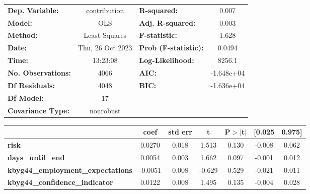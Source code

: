 \begin{center}
\begin{tabular}{lclc}
\toprule
\textbf{Dep. Variable:}                     &   contribution   & \textbf{  R-squared:         } &     0.007   \\
\textbf{Model:}                             &       OLS        & \textbf{  Adj. R-squared:    } &     0.003   \\
\textbf{Method:}                            &  Least Squares   & \textbf{  F-statistic:       } &     1.628   \\
\textbf{Date:}                              & Thu, 26 Oct 2023 & \textbf{  Prob (F-statistic):} &   0.0494    \\
\textbf{Time:}                              &     13:23:08     & \textbf{  Log-Likelihood:    } &    8256.1   \\
\textbf{No. Observations:}                  &        4066      & \textbf{  AIC:               } & -1.648e+04  \\
\textbf{Df Residuals:}                      &        4048      & \textbf{  BIC:               } & -1.636e+04  \\
\textbf{Df Model:}                          &          17      & \textbf{                     } &             \\
\textbf{Covariance Type:}                   &    nonrobust     & \textbf{                     } &             \\
\bottomrule
\end{tabular}
\begin{tabular}{lcccccc}
                                            & \textbf{coef} & \textbf{std err} & \textbf{t} & \textbf{P$> |$t$|$} & \textbf{[0.025} & \textbf{0.975]}  \\
\midrule
\textbf{risk}                               &       0.0270  &        0.018     &     1.513  &         0.130        &       -0.008    &        0.062     \\
\textbf{days\_until\_end}                   &       0.0054  &        0.003     &     1.662  &         0.097        &       -0.001    &        0.012     \\
\textbf{kbyg44\_employment\_expectations}   &      -0.0051  &        0.008     &    -0.629  &         0.529        &       -0.021    &        0.011     \\
\textbf{kbyg44\_confidence\_indicator}      &       0.0122  &        0.008     &     1.495  &         0.135        &       -0.004    &        0.028     \\

\end{tabular}
\end{center}
